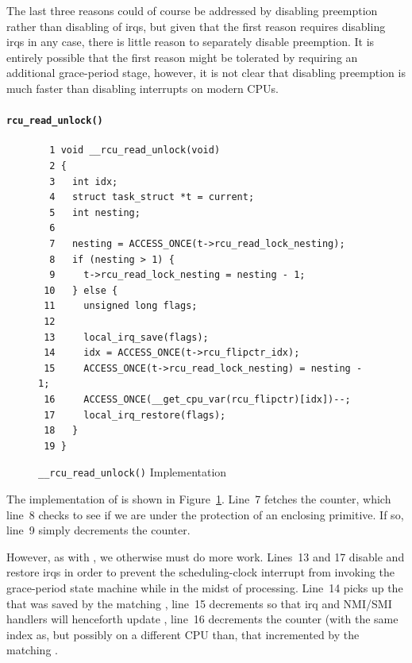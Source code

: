 The last three reasons could of course be addressed by disabling
preemption rather than disabling of irqs, but given that the first
reason requires disabling irqs in any case, there is little reason
to separately disable preemption.
It is entirely possible that the first reason might be tolerated
by requiring an additional grace-period stage, however, it is not
clear that disabling preemption is much faster than disabling
interrupts on modern CPUs.

\paragraph{{\tt rcu\_read\_unlock()}}
\label{app:rcuimpl:rcu_read_unlock()}

\begin{figure}[tbp]
{ \scriptsize
\begin{verbatim}
  1 void __rcu_read_unlock(void)
  2 {
  3   int idx;
  4   struct task_struct *t = current;
  5   int nesting;
  6
  7   nesting = ACCESS_ONCE(t->rcu_read_lock_nesting);
  8   if (nesting > 1) {
  9     t->rcu_read_lock_nesting = nesting - 1;
 10   } else {
 11     unsigned long flags;
 12
 13     local_irq_save(flags);
 14     idx = ACCESS_ONCE(t->rcu_flipctr_idx);
 15     ACCESS_ONCE(t->rcu_read_lock_nesting) = nesting - 1;
 16     ACCESS_ONCE(__get_cpu_var(rcu_flipctr)[idx])--;
 17     local_irq_restore(flags);
 18   }
 19 }
\end{verbatim}
}
\caption{{\tt \_\_rcu\_read\_unlock()} Implementation}
\label{fig:app:rcuimpl:__rcu_read_unlock() Implementation}
\end{figure}

The implementation of  is shown in
Figure~\ref{fig:app:rcuimpl:__rcu_read_unlock() Implementation}.
Line~7 fetches the  counter,
which line~8 checks to see if we are under the protection of an
enclosing  primitive.
If so, line~9 simply decrements the counter.

However, as with , we otherwise must do
more work.
Lines~13 and 17 disable and restore irqs in order to prevent
the scheduling-clock interrupt from invoking the grace-period state machine
while in the midst of  processing.
Line~14 picks up the  that was
saved by the matching ,
line~15
decrements  so that irq and
NMI/SMI handlers will henceforth update ,
line~16 decrements the counter (with the same index as, but possibly
on a different CPU than, that incremented by the matching
.

